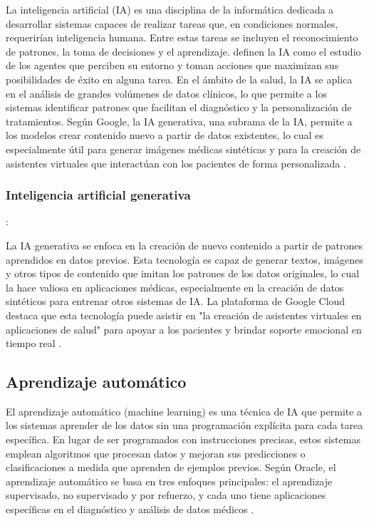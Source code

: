  La inteligencia artificial (IA) es una disciplina de la informática dedicada a desarrollar sistemas capaces de realizar tareas que, en condiciones normales, requerirían inteligencia humana. Entre estas tareas se incluyen el reconocimiento de patrones, la toma de decisiones y el aprendizaje. \parencite{russell2004} definen la IA como el estudio de los agentes que perciben su entorno y toman acciones que maximizan sus posibilidades de éxito en alguna tarea.
En el ámbito de la salud, la IA se aplica en el análisis de grandes volúmenes de datos clínicos, lo que permite a los sistemas identificar patrones que facilitan el diagnóstico y la personalización de tratamientos. Según Google, la IA generativa, una subrama de la IA, permite a los modelos crear contenido nuevo a partir de datos existentes, lo cual es especialmente útil para generar imágenes médicas sintéticas y para la creación de asistentes virtuales que interactúan con los pacientes de forma personalizada \parencite{googlecloud2023}.

\subsubsection{Inteligencia artificial generativa}:

La IA generativa se enfoca en la creación de nuevo contenido a partir de patrones aprendidos en datos previos. Esta tecnología es capaz de generar textos, imágenes y otros tipos de contenido que imitan los patrones de los datos originales, lo cual la hace valiosa en aplicaciones médicas, especialmente en la creación de datos sintéticos para entrenar otros sistemas de IA. La plataforma de Google Cloud destaca que esta tecnología puede asistir en "la creación de asistentes virtuales en aplicaciones de salud" para apoyar a los pacientes y brindar soporte emocional en tiempo real \parencite{googlecloud2023} .

\subsection{Aprendizaje automático}

El aprendizaje automático (machine learning) es una técnica de IA que permite a los sistemas aprender de los datos sin una programación explícita para cada tarea específica. En lugar de ser programados con instrucciones precisas, estos sistemas emplean algoritmos que procesan datos y mejoran sus predicciones o clasificaciones a medida que aprenden de ejemplos previos. Según Oracle, el aprendizaje automático se basa en tres enfoques principales: el aprendizaje supervisado, no supervisado y por refuerzo, y cada uno tiene aplicaciones específicas en el diagnóstico y análisis de datos médicos \parencite{oracle2023}.

